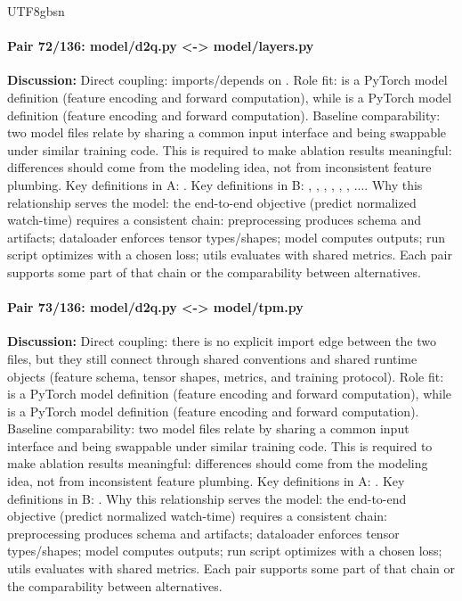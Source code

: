\documentclass[11pt]{article}
\begin{document}
\begin{CJK*}{UTF8}{gbsn}
\paragraph{Pair 72/136: model/d2q.py <-> model/layers.py}
\textbf{Discussion:} Direct coupling: \texttt{} imports/depends on \texttt{}. Role fit: \texttt{} is a PyTorch model definition (feature encoding and forward computation), while \texttt{} is a PyTorch model definition (feature encoding and forward computation). Baseline comparability: two model files relate by sharing a common input interface and being swappable under similar training code. This is required to make ablation results meaningful: differences should come from the modeling idea, not from inconsistent feature plumbing. Key definitions in A: \texttt{}. Key definitions in B: \texttt{}, \texttt{}, \texttt{}, \texttt{}, \texttt{}, \texttt{}, .... Why this relationship serves the model: the end-to-end objective (predict normalized watch-time) requires a consistent chain: preprocessing produces schema and artifacts; dataloader enforces tensor types/shapes; model computes outputs; run script optimizes with a chosen loss; utils evaluates with shared metrics. Each pair supports some part of that chain or the comparability between alternatives.

\paragraph{Pair 73/136: model/d2q.py <-> model/tpm.py}
\textbf{Discussion:} Direct coupling: there is no explicit import edge between the two files, but they still connect through shared conventions and shared runtime objects (feature schema, tensor shapes, metrics, and training protocol). Role fit: \texttt{} is a PyTorch model definition (feature encoding and forward computation), while \texttt{} is a PyTorch model definition (feature encoding and forward computation). Baseline comparability: two model files relate by sharing a common input interface and being swappable under similar training code. This is required to make ablation results meaningful: differences should come from the modeling idea, not from inconsistent feature plumbing. Key definitions in A: \texttt{}. Key definitions in B: \texttt{}. Why this relationship serves the model: the end-to-end objective (predict normalized watch-time) requires a consistent chain: preprocessing produces schema and artifacts; dataloader enforces tensor types/shapes; model computes outputs; run script optimizes with a chosen loss; utils evaluates with shared metrics. Each pair supports some part of that chain or the comparability between alternatives.


\end{CJK*}
\end{document}

